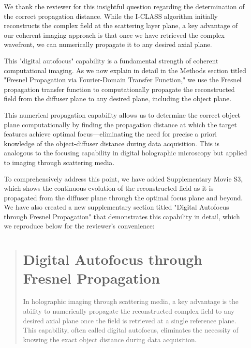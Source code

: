 \documentclass[12pt]{article}
\newenvironment{ourresponse}
    {\begin{tcolorbox}[width=\linewidth,breakable,enhanced,colback=gray!5,colframe=responsecolor!50,title=Response,left=5pt,right=5pt]}
    {\end{tcolorbox}}
\begin{document}
\begin{enumerate}[label=\arabic*.]
\begin{enumerate}[label=3.\alph*.]
        \begin{ourresponse}
            We thank the reviewer for this insightful question regarding the determination of the correct propagation distance. While the I-CLASS algorithm initially reconstructs the complex field at the scattering layer plane, a key advantage of our coherent imaging approach is that once we have retrieved the complex wavefront, we can numerically propagate it to any desired axial plane.
            
            This "digital autofocus" capability is a fundamental strength of coherent computational imaging. As we now explain in detail in the Methods section titled "Fresnel Propagation via Fourier-Domain Transfer Function," we use the Fresnel propagation transfer function to computationally propagate the reconstructed field from the diffuser plane to any desired plane, including the object plane.
            
            This numerical propagation capability allows us to determine the correct object plane computationally by finding the propagation distance at which the target features achieve optimal focus—eliminating the need for precise a priori knowledge of the object-diffuser distance during data acquisition. This is analogous to the focusing capability in digital holographic microscopy but applied to imaging through scattering media.
            
            To comprehensively address this point, we have added Supplementary Movie S3, which shows the continuous evolution of the reconstructed field as it is propagated from the diffuser plane through the optimal focus plane and beyond. We have also created a new supplementary section titled "Digital Autofocus through Fresnel Propagation" that demonstrates this capability in detail, which we reproduce below for the reviewer's convenience:
        
            \begin{quote}
                \section*{Digital Autofocus through Fresnel Propagation}
                
                In holographic imaging through scattering media, a key advantage is the ability to numerically propagate the reconstructed complex field to any desired axial plane once the field is retrieved at a single reference plane. This capability, often called digital autofocus, eliminates the necessity of knowing the exact object distance during data acquisition.
                

\end{quote}
\end{ourresponse}
\end{enumerate}
\end{enumerate}
\end{document}
